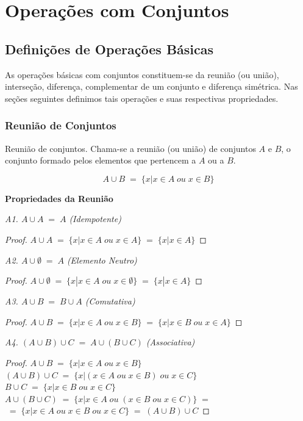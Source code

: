 \section{Operações com Conjuntos}

\subsection{Definições de Operações Básicas}
As operações básicas com conjuntos constituem-se da reunião (ou união), interseção, diferença, complementar de um conjunto e diferença simétrica. Nas seções seguintes definimos tais operações e suas respectivas propriedades.

\subsubsection{Reunião de Conjuntos}

\begin{definition}
	Reunião de conjuntos. Chama-se a reunião (ou união) de conjuntos $A$ e $B$, o conjunto formado pelos elementos que pertencem a $A$ ou a $B$. 
	
	$$ A \cup B \; = \; \{ x | x \in A \; ou \; x \in B \} $$
	
\end{definition} 

\noindent
\textbf{Propriedades da Reunião} 

\emph{A1. $ A \cup A \; = \;  A $ \; (Idempotente) }
\begin{proof}
	$ A \cup A \; = \; \{ x | x \in A \; ou \; x \in A \} \; = \; \{ x | x \in A\}$
\end{proof}


\emph{A2. $ A \cup \emptyset \; = \; A$ \; (Elemento Neutro) }
\begin{proof}
	$ A \cup \emptyset \; = \; \{ x | x \in A \; ou \; x \in \emptyset \} \; = \; \{ x| x \in A \}$
\end{proof}


\emph{A3. $ A \cup B \; = \; B\cup A $ \; (Comutativa)}
\begin{proof}
	$ A \cup B \; = \; \{ x | x \in A \; ou \; x \in B \} \; = \; \{ x | x \in B \; ou \; x \in A \}$
\end{proof}


\emph{A4. $( A \cup B ) \cup C \; = \; A \cup (B \cup C) $ \; (Associativa)}
\begin{proof} 
	
	$ A \cup B \; = \; \{ x | x \in A \; ou \; x \in B \} $ \\
	$ (A \cup B) \cup C \; = \; \{ x | (x \in A \; ou \; x \in B)  \; ou \; x \in C \} $ \\
	$ B \cup C \; = \; \{ x | x \in B \; ou \; x \in C  \} $ \\
	$ A \cup (B \cup C) \; = \; \{ x | x \in A \; ou \; (x \in B \; ou \; x \in C) \} \; = \;$ \\
	$\; = \; \{ x | x \in A \; ou \; x \in B \; ou \; x \in C \} \; = \; ( A \cup B) \cup C$
	
\end{proof}

